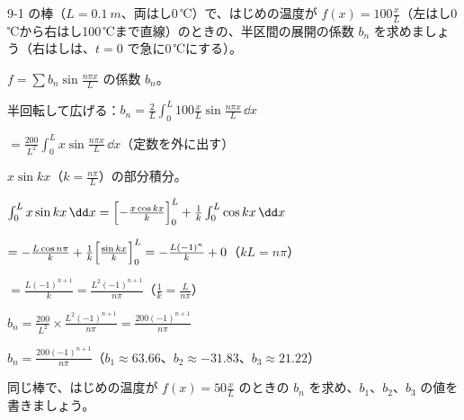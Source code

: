 \begin{reidai}[直線の形の初めの温度]
9-1 の棒（$L=\qty{0.1}{m}$、両はし0\,℃）で、はじめの温度が $f(x)=100\frac{x}{L}$（左はし0\,℃から右はし100\,℃まで直線）のときの、半区間の展開の係数 $b_n$ を求めましょう（右はしは、$t=0$ で急に0\,℃にする）。\par
\kangaekata {}\par
{}\enspace $f=\sum b_n\sin\frac{n\pi x}{L}$ の係数 $b_n$。\par
{}\enspace 半回転して広げる：$b_n=\frac{2}{L}\int_0^L100\frac{x}{L}\sin\frac{n\pi x}{L}\,\dd x$\par
\kixca $=\frac{200}{L^2}\int_0^Lx\sin\frac{n\pi x}{L}\,\dd x$\quad （定数を外に出す）\par
{}\enspace $x\sin kx$（$k=\frac{n\pi}{L}$）の部分積分。\par
\shiki\kixcs $\int_0^Lx\sin kx\,\dd x=\Bigl[-\frac{x\cos kx}{k}\Bigr]_0^L+\frac{1}{k}\int_0^L\cos kx\,\dd x$\par
\kixca $=-\frac{L\cos n\pi}{k}+\frac{1}{k}\Bigl[\frac{\sin kx}{k}\Bigr]_0^L=-\frac{L(-1)^n}{k}+0$\quad （$kL=n\pi$）\par
\kixca $=\frac{L(-1)^{n+1}}{k}=\frac{L^2(-1)^{n+1}}{n\pi}$\quad （$\frac{1}{k}=\frac{L}{n\pi}$）\par
\kixca $b_n=\frac{200}{L^2}\times\frac{L^2(-1)^{n+1}}{n\pi}=\frac{200(-1)^{n+1}}{n\pi}$\par
\kotae $b_n=\frac{200(-1)^{n+1}}{n\pi}$（$b_1\approx63.66$、$b_2\approx-31.83$、$b_3\approx21.22$）
\end{reidai}

\begin{jibun}
同じ棒で、はじめの温度が $f(x)=50\frac{x}{L}$ のときの $b_n$ を求め、$b_1$、$b_2$、$b_3$ の値を書きましょう。
\end{jibun}

